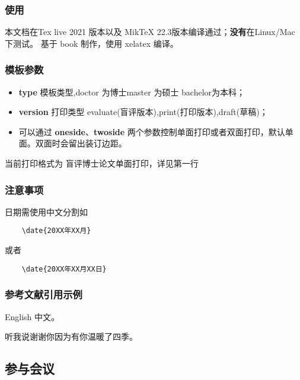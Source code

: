 \documentclass[version=evaluate,type=doctor,oneside]{GZUthesis} %
\begin{document}
\subsection{使用}
本文档在Tex live 2021 版本以及 MikTeX 22.3版本编译通过；\textbf{没有}在Linux/Mac 下测试。
基于 book 制作，使用 xelatex 编译。

\subsection{模板参数}
\begin{itemize}
    \item \textbf{type} 模板类型,doctor 为博士master 为硕士 bachelor为本科；
    \item \textbf{version} 打印类型 evaluate(盲评版本),print(打印版本),draft(草稿)；
    \item 可以通过 \textbf{oneside}、\textbf{twoside} 两个参数控制单面打印或者双面打印，默认单面。双面时会留出装订边距。
\end{itemize}

当前打印格式为 盲评博士论文单面打印，详见第一行

\subsection{注意事项}
日期需使用中文分割如
\begin{verbatim}
    \date{20XX年XX月}
\end{verbatim}
 或者
 \begin{verbatim}
    \date{20XX年XX月XX日}
\end{verbatim} \par

\subsection{参考文献引用示例}
English\cite{gates1995road}
中文\cite{孙其博2010物联网}。
\begin{thank}
	听我说谢谢你因为有你温暖了四季。
\end{thank}
\printbibliography

\begin{appendices}
	\chapter{参与会议}
\end{appendices}
\end{document}

